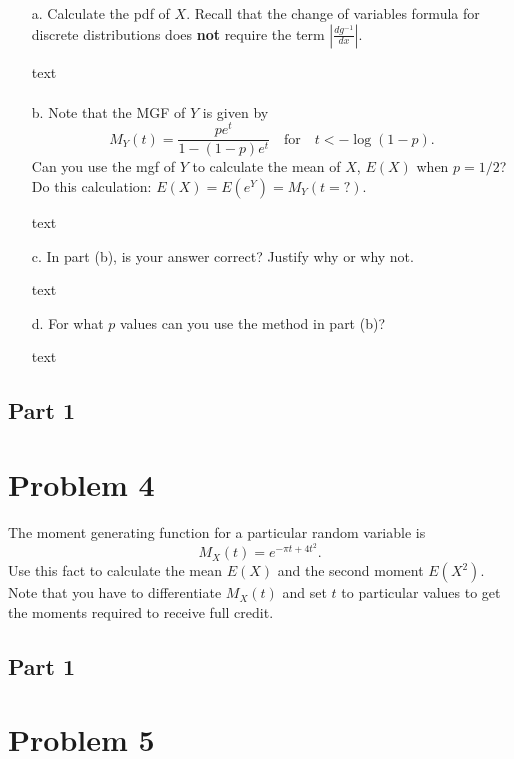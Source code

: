 \documentclass{article}
\begin{document}
    \begin{enumerate}
    \item[a.]
      Calculate the pdf of $X$. Recall that the change of variables formula for discrete distributions does \textbf{not} require the term $\left|\frac{dg^{-1}}{dx}\right|$.
    \item[]
      text
      \[
      \begin{aligned}
      \end{aligned}
      \]
    \item[b.]
      Note that the MGF of $Y$ is given by
      \[
      M_Y(t)= \frac{pe^t}{1-(1-p)e^t} \quad \textrm{for} \quad t<-\log(1-p).
      \]
      Can you use the mgf of $Y$ to calculate the mean of $X$, $E(X)$ when $p = 1/2$? Do this calculation: $E(X) = E(e^Y) = M_Y(t=?)$.
    \item[]
      text
    \item[c.]
      In part (b), is your answer correct? Justify why or why not.
    \item[]
      text
    \item[d.]
      For what $p$ values can you use the method in part (b)?
    \item[]
      text
    \end{enumerate}
    \clearpage

\subsection*{Part 1}



\section*{Problem 4}

    The moment generating function for a particular random variable is 
    \[
    M_X(t) = e^{-\pi t + 4t^2}.
    \]
    Use this fact to calculate the mean $E(X)$ and the second moment $E(X^2)$. Note that you have to differentiate $M_X(t)$ and set $t$ to particular values to get the moments required to receive full credit.

      \clearpage

\subsection*{Part 1}


\section*{Problem 5}
\end{document}

